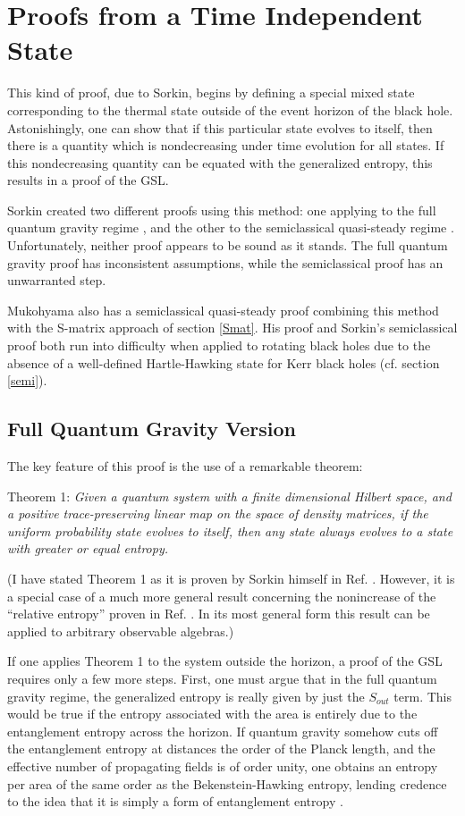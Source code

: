 \documentclass[12pt]{article}
\begin{document}
\section{Proofs from a Time Independent State}\label{special}
This kind of proof, due to Sorkin, begins by defining a special mixed state corresponding to the thermal state outside of the event horizon of the black hole.  Astonishingly, one can show that if this particular state evolves to itself, then there is a quantity which is nondecreasing under time evolution for all states.  If this nondecreasing quantity can be equated with the generalized entropy, this results in a proof of the GSL.

Sorkin created two different proofs using this method: one applying to the full quantum gravity regime \cite{sorkin86}, and the other to the semiclassical quasi-steady regime \cite{sorkin98}.  Unfortunately, neither proof appears to be sound as it stands.  The full quantum gravity proof has inconsistent assumptions, while the semiclassical proof has an unwarranted step.

Mukohyama also has a semiclassical quasi-steady proof \cite{muko97} combining this method with the S-matrix approach of section \ref{Smat}.  His proof and Sorkin's semiclassical proof both run into difficulty when applied to rotating black holes due to the absence of a well-defined Hartle-Hawking state for Kerr black holes (cf. section \ref{semi}).

\subsection{Full Quantum Gravity Version}\label{full}

The key feature of this proof \cite{sorkin98} is the use of a remarkable theorem:

Theorem 1: \emph{Given a quantum system with a finite dimensional Hilbert space, and a positive trace-preserving linear map on the space of density matrices, if the uniform probability state evolves to itself, then any state always evolves to a state with greater or equal entropy.}

(I have stated Theorem 1 as it is proven by Sorkin himself in Ref. \cite{sorkin98}.  However, it is a special case of a much more general result concerning the nonincrease of the ``relative entropy'' proven in Ref. \cite{lindblad75}.  In its most general form this result can be applied to arbitrary observable algebras.)

If one applies Theorem 1 to the system outside the horizon, a proof of the GSL requires only a few more steps.  First, one must argue that in the full quantum gravity regime, the generalized entropy is really given by just the $S_{out}$ term.  This would be true if the entropy associated with the area is entirely due to the entanglement entropy across the horizon.  If quantum gravity somehow cuts off the entanglement entropy at distances the order of the Planck length, and the effective number of propagating fields is of order unity, one obtains an entropy per area of the same order as the Bekenstein-Hawking entropy, lending credence to the idea that it is simply a form of entanglement entropy \cite{sorkin83}\cite{jacobson94}.
\end{document}
